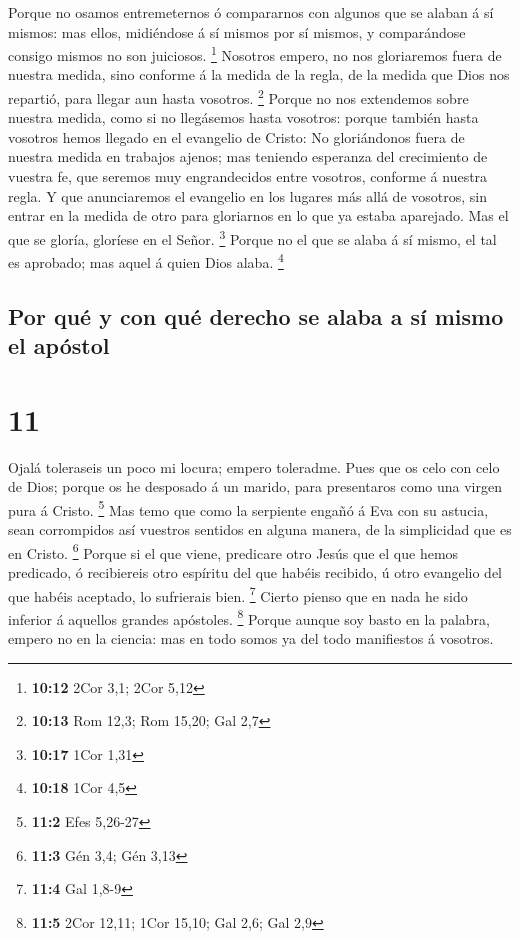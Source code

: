  Porque no osamos entremeternos ó compararnos con algunos
que se alaban á sí mismos: mas ellos, midiéndose á sí mismos por sí
mismos, y comparándose consigo mismos no son juiciosos. \footnote{\textbf{10:12}
  2Cor 3,1; 2Cor 5,12}  Nosotros empero, no nos gloriaremos
fuera de nuestra medida, sino conforme á la medida de la regla, de la
medida que Dios nos repartió, para llegar aun hasta vosotros.
\footnote{\textbf{10:13} Rom 12,3; Rom 15,20; Gal 2,7} 
Porque no nos extendemos sobre nuestra medida, como si no llegásemos
hasta vosotros: porque también hasta vosotros hemos llegado en el
evangelio de Cristo:  No gloriándonos fuera de nuestra
medida en trabajos ajenos; mas teniendo esperanza del crecimiento de
vuestra fe, que seremos muy engrandecidos entre vosotros, conforme á
nuestra regla.  Y que anunciaremos el evangelio en los
lugares más allá de vosotros, sin entrar en la medida de otro para
gloriarnos en lo que ya estaba aparejado.  Mas el que se
gloría, gloríese en el Señor. \footnote{\textbf{10:17} 1Cor 1,31}
 Porque no el que se alaba á sí mismo, el tal es aprobado;
mas aquel á quien Dios alaba. \footnote{\textbf{10:18} 1Cor 4,5}

\hypertarget{por-quuxe9-y-con-quuxe9-derecho-se-alaba-a-suxed-mismo-el-apuxf3stol}{%
\subsection{Por qué y con qué derecho se alaba a sí mismo el
apóstol}\label{por-quuxe9-y-con-quuxe9-derecho-se-alaba-a-suxed-mismo-el-apuxf3stol}}

\hypertarget{section-10}{%
\section{11}\label{section-10}}

 Ojalá toleraseis un poco mi locura; empero toleradme.
 Pues que os celo con celo de Dios; porque os he desposado á
un marido, para presentaros como una virgen pura á Cristo. \footnote{\textbf{11:2}
  Efes 5,26-27}  Mas temo que como la serpiente engañó á Eva
con su astucia, sean corrompidos así vuestros sentidos en alguna manera,
de la simplicidad que es en Cristo. \footnote{\textbf{11:3} Gén 3,4; Gén
  3,13}  Porque si el que viene, predicare otro Jesús que el
que hemos predicado, ó recibiereis otro espíritu del que habéis
recibido, ú otro evangelio del que habéis aceptado, lo sufrierais bien.
\footnote{\textbf{11:4} Gal 1,8-9}  Cierto pienso que en
nada he sido inferior á aquellos grandes apóstoles. \footnote{\textbf{11:5}
  2Cor 12,11; 1Cor 15,10; Gal 2,6; Gal 2,9}  Porque aunque
soy basto en la palabra, empero no en la ciencia: mas en todo somos ya
del todo manifiestos á vosotros.


